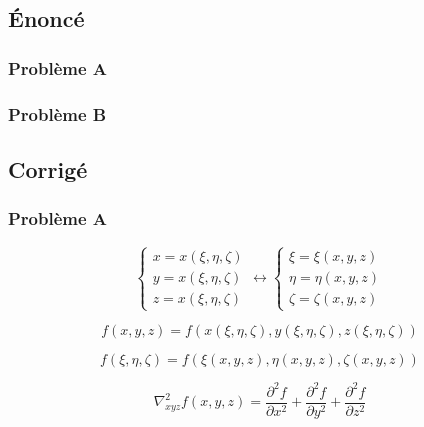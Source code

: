 \documentclass
[
a4paper,                      %
twoside,					  %
12pt,                         %
abstract,		      %
fleqn,                        %
]
{scrartcl} %
\begin{document}
\subsection{\'Enonc\'e}

\subsubsection{Probl\`eme A}

\subsubsection{Probl\`eme B}

\subsection{Corrig\'e}

\subsubsection{Probl\`eme A}

\begin{equation}
\begin{cases}
x=x\left(\xi,\eta,\zeta\right)\\
y=x\left(\xi,\eta,\zeta\right)\\
z=x\left(\xi,\eta,\zeta\right)
\end{cases}\longleftrightarrow\begin{cases}
\xi=\xi\left(x,y,z\right)\\
\eta=\eta\left(x,y,z\right)\\
\zeta=\zeta\left(x,y,z\right)
\end{cases}
\end{equation}

\begin{equation}
f\left(x,y,z\right)=f\left(x\left(\xi,\eta,\zeta\right),y\left(\xi,\eta,\zeta\right),z\left(\xi,\eta,\zeta\right)\right)
\end{equation}

\begin{equation}
f\left(\xi,\eta,\zeta\right)=f\left(\xi\left(x,y,z\right),\eta\left(x,y,z\right),\zeta\left(x,y,z\right)\right)
\end{equation}

\begin{equation}
\nabla_{xyz}^{2}f\left(x,y,z\right)=\frac{\partial^{2} f}{\partial x^{2}}+\frac{\partial^{2} f}{\partial y^{2}}+\frac{\partial^{2} f}{\partial z^{2}}
\end{equation}
\end{document}
